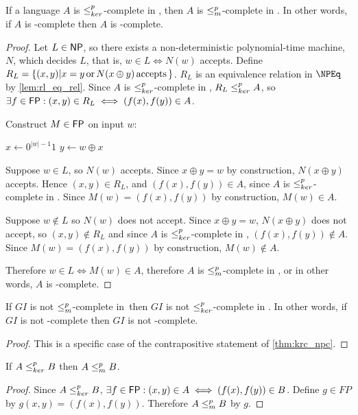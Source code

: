 \begin{theorem}\label{thm:krc_npc}If a language $A$ is $\leq^{p}_{ker}$-complete in \NPEq,
  then $A$ is $\leq^{p}_{m}$-complete in \NP. In other words, if $A$ is \NPEq-complete
  then $A$ is \NP-complete.\end{theorem}
\begin{proof}
  Let $L\in{\ensuremath{\mathsf{NP}}}$, so there exists a non-deterministic polynomial-time machine,
  $N$, which decides $L$, that is, $w\in L\iff N(w)$ accepts. Define
  $R_L=\{(x,y)|x=y \,\text{or}\, N(x\oplus y) \,\text{accepts}\,\}$. $R_L$ is an
  equivalence relation in $\NPEq$ by \autoref{lem:rl_eq_rel}. Since $A$ is
  $\leq^{p}_{ker}$-complete in \NPEq, $R_L\leq^{p}_{ker} A$, so $\exists f\in{\ensuremath{\mathsf{FP}}}:(x,y)\in R_L\iff
  (f(x), f(y))\in A$.

  Construct $M\in{\ensuremath{\mathsf{FP}}}$ on input $w$:\\
  \begin{algorithm}[H]
    $x\gets0^{|w|-1}1$\;
    $y\gets w\oplus x$\;
  \end{algorithm}

  Suppose $w\in L$, so $N(w)$ accepts. Since $x\oplus y=w$ by construction,
  $N(x\oplus y)$ accepts. Hence $(x,y)\in R_L$, and $(f(x),f(y))\in A$, since
  $A$ is $\leq^{p}_{ker}$-complete in \NPEq. Since $M(w)=(f(x),f(y))$ by construction,
  $M(w)\in A$.
  
  Suppose $w\notin L$ so $N(w)$ does not accept. Since $x\oplus y=w$,
  $N(x\oplus y)$ does not accept, so $(x,y)\notin R_L$ and since $A$ is
  $\leq^{p}_{ker}$-complete in \NPEq, $(f(x), f(y))\notin A$. Since $M(w)=(f(x),f(y))$ by
  construction, $M(w)\notin A$.

  Therefore $w\in L\iff M(w)\in A$, therefore $A$ is $\leq^{p}_{m}$-complete in \NP,
  or in other words, $A$ is \NP-complete.
\end{proof}

\begin{corollary}\label{cor:gi_complete}If $GI$ is not $\leq^{p}_{m}$-complete in
  \NP\,then $GI$ is not $\leq^{p}_{ker}$-complete in \NPEq. In other words, if $GI$ is not
  \NP-complete then $GI$ is not \NPEq-complete.\end{corollary}
\begin{proof}
  This is a specific case of the contrapositive statement of
  \autoref{thm:krc_npc}.
\end{proof}

\begin{lemma}\label{lem:kr_mor}If $A\leq^{p}_{ker} B$ then $A\leq^{p}_{m} B$.\end{lemma}
\begin{proof}Since $A\leq^{p}_{ker} B$, $\exists f\in{\ensuremath{\mathsf{FP}}}: (x,y)\in A\iff(f(x), f(y))\in
  B$. Define $g\in FP$ by $g(x,y)=(f(x), f(y))$. Therefore $A\leq^{p}_{m} B$ by
  $g$.\end{proof}

